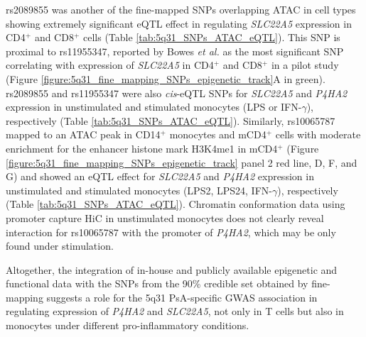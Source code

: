 rs2089855 was another of the fine-mapped SNPs overlapping ATAC in cell types showing extremely significant eQTL effect in regulating \textit{SLC22A5} expression in CD4$^+$ and CD8$^+$ cells (Table \ref{tab:5q31_SNPs_ATAC_eQTL}). This SNP is proximal to rs11955347, reported by Bowes \textit{et al.} as the most significant SNP correlating with expression of \textit{SLC22A5} in CD4$^+$ and CD8$^+$ in a pilot study (Figure \ref{figure:5q31_fine_mapping_SNPs_epigenetic_track}A in green). rs2089855 and rs11955347 were also \textit{cis}-eQTL SNPs for \textit{SLC22A5} and \textit{P4HA2} expression in unstimulated and stimulated monocytes (LPS or IFN-$\gamma$), respectively (Table \ref{tab:5q31_SNPs_ATAC_eQTL}). Similarly, rs10065787 mapped to an ATAC peak in CD14$^+$ monocytes and mCD4$^+$ cells with moderate enrichment for the enhancer histone mark H3K4me1 in mCD4$^+$ (Figure \ref{figure:5q31_fine_mapping_SNPs_epigenetic_track} panel 2 red line, D, F, and G) and showed an eQTL effect for \textit{SLC22A5} and \textit{P4HA2} expression in unstimulated and stimulated monocytes (LPS2, LPS24, IFN-$\gamma$), respectively (Table \ref{tab:5q31_SNPs_ATAC_eQTL}). Chromatin conformation data using promoter capture HiC \parencite{Javierre2016} in unstimulated monocytes does not clearly reveal interaction for rs10065787 with the promoter of \textit{P4HA2}, which may be only found under stimulation.



Altogether, the integration of in-house and publicly available epigenetic and functional data with the SNPs from the 90\% credible set obtained by fine-mapping suggests a role for the 5q31 PsA-specific GWAS association in regulating expression of \textit{P4HA2} and \textit{SLC22A5}, not only in T cells but also in monocytes under different pro-inflammatory conditions.








